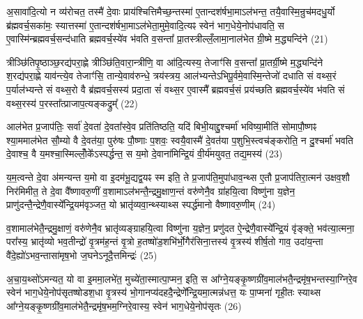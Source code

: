 {\anuvakamend[{स॒ङ्ग्रा॒मे तेनाल॑मभिमाति॒घ्ने ल॒लामं॑ प्राशृ॒ङ्गमैनं॒ पञ्च॑दश च।3।}]}

अ॒सावा॑दि॒त्यो न व्य॑रोचत॒ तस्मै॑ दे॒वाः प्राय॑श्चित्तिमैच्छ॒न्तस्मा॑ ए॒तान्दश॑र्\mbox{}षभा॒मा\-ऽल॑भन्त॒ तयै॒वास्मि॒न्रुच॑मदधु॒र्यो ब्र॑ह्मवर्च॒सका॑मः॒ स्यात्तस्मा॑ ए॒तान्दश॑र्\mbox{}षभा॒मा\-ऽल॑भेता॒मुमे॒वादि॒त्यꣴ स्वेन॑ भाग॒धेये॒नोप॑धावति॒ स ए॒वास्मि॑न्ब्रह्म\-वर्च॒सन्द॑धाति ब्रह्मवर्च॒स्ये॑व भ॑वति व॒सन्ता᳚ प्रा॒तस्त्रील्लँ॒लामा॒नाल॑भेत ग्री॒ष्मे म॒द्ध्यन्दि॑ने (21)

त्रीञ्छि॑तिपृ॒ष्ठाञ्छ॒रद्य॑परा॒ह्णे त्रीञ्छि॑ति॒वारा॒न्त्रीणि॒ वा आ॑दि॒त्यस्य॒ तेजाꣳ॑सि व॒सन्ता᳚ प्रा॒तर्ग्री॒ष्मे म॒द्ध्यन्दि॑ने श॒रद्य॑परा॒ह्णे याव॑न्त्ये॒व तेजाꣳ॑सि॒ तान्ये॒वाव॑रुन्धे॒ त्रय॑स्त्रय॒ आल॑भ्यन्ते\-ऽभिपू॒र्वमे॒वास्मि॒न्तेजो॑ दधाति सं वथ्स॒रं प॒र्याल॑भ्यन्ते सं वथ्स॒रो वै ब्र॑ह्मवर्च॒सस्य॑ प्रदा॒ता सं॑ वथ्स॒र ए॒वास्मै᳚ ब्रह्मवर्च॒सं प्रय॑च्छति ब्रह्मवर्च॒स्ये॑व भ॑वति सं वथ्स॒रस्य॑ प॒रस्ता᳚त्प्राजाप॒त्यङ्कद्रुम्᳚ (22)

आल॑भेत प्र॒जाप॑तिः॒ सर्वा॑ दे॒वता॑ दे॒वता᳚स्वे॒व प्रति॑तिष्ठति॒ यदि॑ बिभी॒याद्दु॒श्चर्मा॑ भविष्या॒मीति॑ सोमापौ॒ष्णꣴ श्या॒ममाल॑भेत सौ॒म्यो वै दे॒वत॑या॒ पुरु॑षः पौ॒ष्णाः प॒शवः॒ स्वयै॒वास्मै॑ दे॒वत॑या प॒शुभि॒स्त्वच॑ङ्करोति॒ न दु॒श्चर्मा॑ भवति दे॒वाश्च॒ वै य॒मश्चा॒स्मिल्लोँ॒के᳚\-ऽस्पर्द्धन्त॒ स य॒मो दे॒वाना॑मिन्द्रि॒यं वी॒र्य॑मयुवत॒ तद्य॒मस्य॑ (23)

य॒म॒त्वन्ते दे॒वा अ॑मन्यन्त य॒मो वा इ॒दम॑भू॒द्यद्व॒यꣴ स्म इति॒ ते प्र॒जाप॑ति॒मुपा॑धाव॒न्थ्स ए॒तौ प्र॒जाप॑तिरा॒त्मन॑ उक्षव॒शौ निर॑मिमीत॒ ते दे॒वा वै᳚ष्णावरु॒णीं व॒शामा\-ऽल॑भन्तै॒न्द्रमु॒क्षाण॒न्तं वरु॑णेनै॒व ग्रा॑हयि॒त्वा विष्णु॑ना य॒ज्ञेन॒ प्राणु॑दन्तै॒न्द्रेणै॒वास्ये᳚न्द्रि॒यम॑वृञ्जत॒ यो भ्रातृ॑व्यवा॒न्थ्स्याथ्स स्पर्द्ध॑मानो वैष्णावरु॒णीम् (24)

व॒शामाल॑भेतै॒न्द्रमु॒क्षाणं॒ वरु॑णेनै॒व भ्रातृ॑व्यङ्ग्राहयि॒त्वा विष्णु॑ना य॒ज्ञेन॒ प्रणु॑दत ऐ॒न्द्रेणै॒वास्ये᳚न्द्रि॒यं वृ॑ङ्क्ते॒ भव॑त्या॒त्मना॒ परा᳚स्य॒ भ्रातृ॑व्यो भव॒तीन्द्रो॑ वृ॒त्रम॑ह॒न्तं वृ॒त्रो ह॒तष्षो॑ड॒शभि॑र्भो॒गैर॑सिना॒त्तस्य॑ वृ॒त्रस्य॑ शीर्\mbox{}ष॒तो गाव॒ उदा॑य॒न्ता वै॑दे॒ह्यो॑\-ऽभव॒न्तासा॑मृष॒भो ज॒घने\-ऽनूदै॒त्तमिन्द्रः॑ (25)

अ॒चा॒य॒थ्सो॑\-ऽमन्यत॒ यो वा इ॒ममा॒लभे॑त॒ मुच्ये॑ता॒स्मात्पा॒प्मन॒ इति॒ स आ᳚ग्ने॒यङ्कृ॒ष्णग्री॑व॒माल॑भतै॒न्द्रमृ॑ष॒भन्तस्या॒ग्निरे॒व स्वेन॑ भाग॒धेये॒नोप॑सृतष्षोडश॒धा वृ॒त्रस्य॑ भो॒गानप्य॑दहदै॒न्द्रेणे᳚न्द्रि॒यमा॒त्मन्न॑धत्त॒ यः पा॒प्मना॑ गृही॒तः स्याथ्स आ᳚ग्ने॒यङ्कृ॒ष्णग्री॑व॒माल॑भेतै॒न्द्रमृ॑ष॒भम॒ग्निरे॒वास्य॒ स्वेन॑ भाग॒धेये॒नोप॑सृतः (26)

